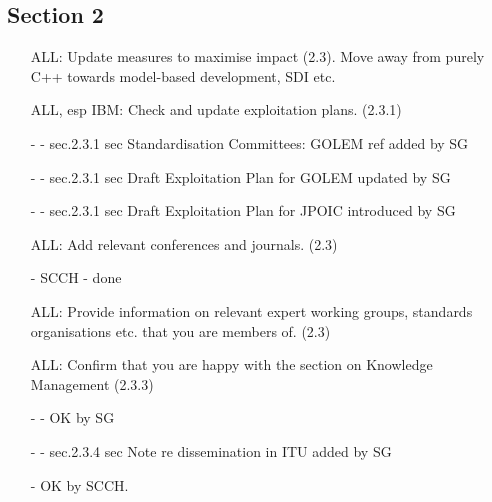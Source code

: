 \subsection*{Section 2}
\begin{itemize}
\item[ALL:]
Update measures to maximise impact (2.3).  Move away from purely C++ towards model-based development, SDI etc.
\item[ALL, esp IBM:]
Check and update exploitation plans. (2.3.1)
\item[-] - sec.2.3.1 sec Standardisation Committees:  GOLEM ref added by SG
\item[-] - sec.2.3.1 sec Draft Exploitation Plan for GOLEM updated by SG \item[-] - sec.2.3.1 sec Draft Exploitation Plan for JPOIC introduced by SG

\item[ALL:]
Add relevant conferences and journals.  (2.3)
\item[-] SCCH - done
\item[ALL:]
Provide information on relevant expert working groups, standards organisations etc. that you are members of.  (2.3)
\item[ALL:]
Confirm that you are happy with the section on Knowledge Management (2.3.3)\item[-] - OK by SG
\item[-] - sec.2.3.4 sec  Note re dissemination in ITU added by SG
\item[-] OK by SCCH.
\end{itemize}

